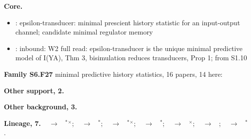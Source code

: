 \documentclass[10pt]{article}
\newcommand{\memb}[1]{\par\smallskip\textbf{#1}\quad}
\begin{document}
\memb{Core.}
\begin{itemize}[nosep,leftmargin=1.2em]
\item \citet{Barnett-computational15}: epsilon-transducer: minimal prescient history statistic for an input-output channel; candidate minimal regulator memory
\item \citet{Rosas-ai25}: inbound: W2 full read: epsilon-transducer is the unique minimal predictive model of I(Y\textbar{}A), Thm 3, bisimulation reduces transducers, Prop 1; from S1.10
\end{itemize}
\memb{Family S6.F27} minimal predictive history statistics, 16 papers, 14 here: {\footnotesize \citetext{\citealp{Barnett-computational15}; \citealp{Shalizi-computational99}; \citealp{Baisero-reconciling21}; \citealp{Singh-predictive04}; \citealp{Creutzig-pastfuture09}; \citealp{Han-variational19}; \citealp{Zhang-learning19}; \citealp{Lambrechts-recurrent22}; \citealp{Dave-approximate23}; \citealp{Seyedsalehi-approximate23}; \citealp{Kwon-empirical24}; \citealp{Sinha-agentstate24}; \citealp{Li-learning25}; \citealp{Deng-abstract26}}}

\memb{Other support, 2.} \citetext{\citealp{Marzen-resourcerational24}; \citealp{Dai-worth26}}

\memb{Other background, 3.} {\footnotesize \citetext{\citealp{McCallum-instancebased95}; \citealp{Bozkurt-suboptimality26}; \citealp{Xu-integrating26}}}

\memb{Lineage, 7.} {\footnotesize \citeauthor{McCallum-instancebased95}~\citeyear{McCallum-instancebased95} $\to$ \citeauthor{Subramanian-approximate20}~\citeyear{Subramanian-approximate20}$^\ast$$^\times$; \citeauthor{Shalizi-computational99}~\citeyear{Shalizi-computational99} $\to$ \citeauthor{Barnett-computational15}~\citeyear{Barnett-computational15}$^\ast$; \citeauthor{Singh-predictive04}~\citeyear{Singh-predictive04} $\to$ \citeauthor{Subramanian-approximate20}~\citeyear{Subramanian-approximate20}$^\ast$$^\times$; \citeauthor{Singh-predictive04}~\citeyear{Singh-predictive04} $\to$ \citeauthor{Baisero-reconciling21}~\citeyear{Baisero-reconciling21}$^\ast$; \citeauthor{Still-information09}~\citeyear{Still-information09} $\to$ \citeauthor{Marzen-resourcerational24}~\citeyear{Marzen-resourcerational24}$^\times$; \citeauthor{Barnett-computational15}~\citeyear{Barnett-computational15} $\to$ \citeauthor{Rosas-ai25}~\citeyear{Rosas-ai25}; \citeauthor{Hermanns-probabilistic14}~\citeyear{Hermanns-probabilistic14} $\to$ \citeauthor{Rosas-ai25}~\citeyear{Rosas-ai25}$^\ast$.}
\end{document}
